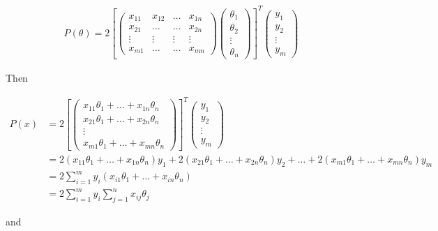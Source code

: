 \begin{align*}
    P(\theta) = 2
    \left[
    \begin{pmatrix}
        x_{11} & x_{12} & \dots & x_{1n} \\
        x_{21} & \dots  & \dots & x_{2n} \\
        \vdots & \vdots & \vdots & \vdots \\
        x_{m1} & \dots & \dots & x_{mn}
    \end{pmatrix}
    \begin{pmatrix}
        \theta_1 \\
        \theta_2 \\
        \vdots \\
        \theta_n
    \end{pmatrix}
    \right]^T
    \begin{pmatrix}
        y_1 \\
        y_2 \\
        \vdots \\
        y_m
    \end{pmatrix}
\end{align*}

\noindent Then

\begin{align*}
    P(x) &= 2
    \left[
    \begin{pmatrix}
        x_{11}\theta_1 + \dots + x_{1n}\theta_n \\
        x_{21}\theta_1 + \dots + x_{2n}\theta_n \\
        \vdots \\
        x_{m1}\theta_1 + \dots + x_{mn}\theta_n
    \end{pmatrix}
    \right]^T
    \begin{pmatrix}
        y_1 \\
        y_2 \\
        \vdots \\
        y_m
    \end{pmatrix} \\
    &= 2(x_{11}\theta_1+\dots+x_{1n}\theta_n)y_1 + 2(x_{21}\theta_1+\dots+x_{2n}\theta_n)y_2
    + \dots + 2(x_{m1}\theta_1+\dots+x_{mn}\theta_n)y_m \\
    &= 2\sum^m_{i=1}y_i(x_{i1}\theta_1 +\dots+ x_{in}\theta_n) \\
    &= 2\sum^m_{i=1}y_i \sum^n_{j=1} x_{ij}\theta_j
\end{align*}

\noindent and

